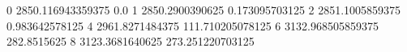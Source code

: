0 2850.116943359375 0.0
1 2850.2900390625 0.173095703125
2 2851.1005859375 0.983642578125
4 2961.8271484375 111.710205078125
6 3132.968505859375 282.8515625
8 3123.3681640625 273.251220703125
